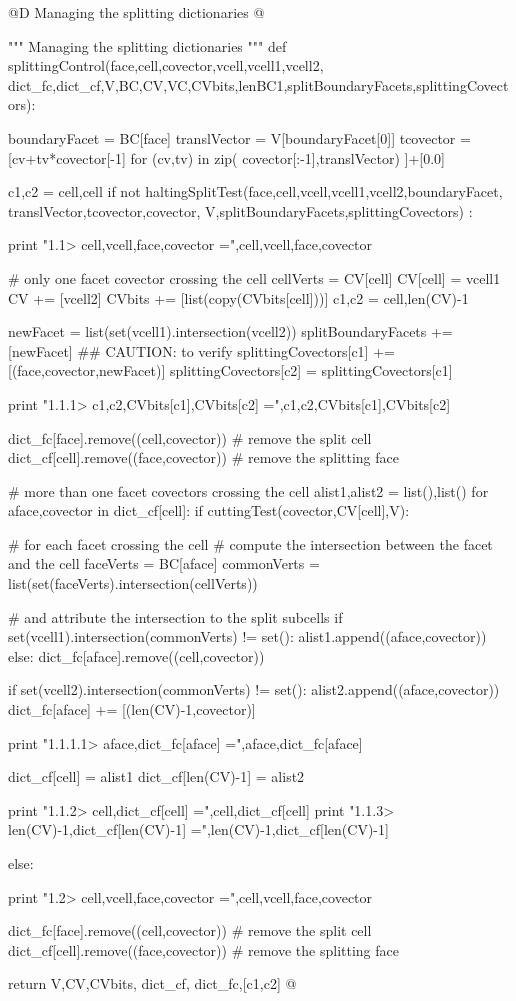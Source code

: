 \documentclass[11pt,oneside]{article}	%
\begin{document}
@D Managing the splitting dictionaries
@{""" Managing the splitting dictionaries """
def splittingControl(face,cell,covector,vcell,vcell1,vcell2,
		dict_fc,dict_cf,V,BC,CV,VC,CVbits,lenBC1,splitBoundaryFacets,splittingCovectors):

	boundaryFacet = BC[face]
	translVector = V[boundaryFacet[0]]
	tcovector = [cv+tv*covector[-1] for (cv,tv) in zip(
					covector[:-1],translVector) ]+[0.0]

	c1,c2 = cell,cell
	if not haltingSplitTest(face,cell,vcell,vcell1,vcell2,boundaryFacet,
								translVector,tcovector,covector,
								V,splitBoundaryFacets,splittingCovectors) :
								
		print "1.1> cell,vcell,face,covector =",cell,vcell,face,covector

		# only one facet covector crossing the cell
		cellVerts = CV[cell]
		CV[cell] = vcell1
		CV += [vcell2]
		CVbits += [list(copy(CVbits[cell]))]
		c1,c2 = cell,len(CV)-1
		
		newFacet = list(set(vcell1).intersection(vcell2))
		splitBoundaryFacets += [newFacet]  ## CAUTION: to verify
		splittingCovectors[c1] += [(face,covector,newFacet)]
		splittingCovectors[c2] = splittingCovectors[c1]
		
		print "1.1.1> c1,c2,CVbits[c1],CVbits[c2] =",c1,c2,CVbits[c1],CVbits[c2]
		
		dict_fc[face].remove((cell,covector))	# remove the split cell
		dict_cf[cell].remove((face,covector))	# remove the splitting face
				
		# more than one facet covectors crossing the cell
		alist1,alist2 = list(),list()
		for aface,covector in dict_cf[cell]:
			if cuttingTest(covector,CV[cell],V):
		
    			# for each facet crossing the cell
    			# compute the intersection between the facet and the cell
    			faceVerts = BC[aface]
    			commonVerts = list(set(faceVerts).intersection(cellVerts))
    			
    			# and attribute the intersection to the split subcells
    			if set(vcell1).intersection(commonVerts) != set():
    				alist1.append((aface,covector))
    			else: dict_fc[aface].remove((cell,covector)) 
    					
    			if set(vcell2).intersection(commonVerts) != set():
    				alist2.append((aface,covector))
    				dict_fc[aface] += [(len(CV)-1,covector)]
    		
    			print "1.1.1.1> aface,dict_fc[aface] =",aface,dict_fc[aface]
			
		dict_cf[cell] = alist1  
		dict_cf[len(CV)-1] = alist2
		
		print "1.1.2> cell,dict_cf[cell] =",cell,dict_cf[cell]
		print "1.1.3> len(CV)-1,dict_cf[len(CV)-1] =",len(CV)-1,dict_cf[len(CV)-1]
		
	else:
	
		print "1.2> cell,vcell,face,covector =",cell,vcell,face,covector
		
		dict_fc[face].remove((cell,covector))	# remove the split cell
		dict_cf[cell].remove((face,covector))	# remove the splitting face	
		
	return V,CV,CVbits, dict_cf, dict_fc,[c1,c2]
@}
\end{document}
